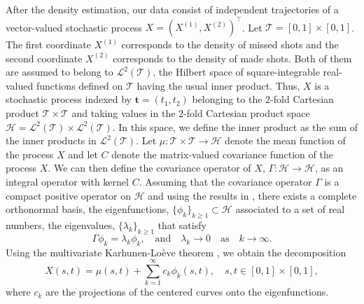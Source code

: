 \documentclass[USenglish]{article}
\theoremstyle{dgthm}
\theoremstyle{dgdef}
\begin{document}
After the density estimation, our data consist of independent trajectories of a vector-valued stochastic process $X = (X^{(1)}, X^{(2)})^{\top}$. Let $\mathcal{T} = [0, 1] \times [0, 1]$. The first coordinate $X^{(1)}$ corresponds to the density of missed shots and the second coordinate $X^{(2)}$ corresponds to the density of made shots. Both of them are assumed to belong to $\mathcal{L}^2(\mathcal{T})$, the Hilbert space of square-integrable real-valued functions defined on $\mathcal{T}$ having the usual inner product. Thus, $X$ is a stochastic process indexed by $\mathbf{t} = (t_1, t_2)$ belonging to the $2$-fold Cartesian product $\mathcal{T} \times \mathcal{T}$ and taking values in the $2$-fold Cartesian product space $\mathcal{H} = \mathcal{L}^2(\mathcal{T}) \times \mathcal{L}^2(\mathcal{T})$. In this space, we define the inner product as the sum of the inner products in $\mathcal{L}^2(\mathcal{T})$. Let $\mu: \mathcal{T} \times \mathcal{T} \rightarrow \mathcal{H}$ denote the mean function of the process $X$ and let $C$ denote the matrix-valued covariance function of the process $X$. We can then define the covariance operator of $X$, $\Gamma: \mathcal{H} \rightarrow \mathcal{H}$, as an integral operator with kernel $C$.
Assuming that the covariance operator $\Gamma$ is a compact positive operator on $\mathcal{H}$ and using the results in \cite{happMultivariateFunctionalPrincipal2018}, there exists a complete orthonormal basis, the eigenfunctions, $\{\phi_k\}_{k \geq 1} \subset \mathcal{H}$ associated to a set of real numbers, the eigenvalues, $\{\lambda_k\}_{k \geq 1}$ that satisfy
$$\Gamma \phi_k = \lambda_k \phi_k, \quad\text{and}\quad \lambda_k \rightarrow 0 \quad\text{as}\quad k \rightarrow \infty.$$
Using the multivariate Karhunen-Loève theorem \citep{happMultivariateFunctionalPrincipal2018}, we obtain the decomposition
\begin{equation}\label{eq:kl_decomp_inf}
	X(s, t) = \mu(s, t) + \sum_{k = 1}^{\infty} c_k\phi_k(s, t), \quad s, t \in [0, 1] \times [0, 1],
\end{equation}
where $c_k$ are the projections of the centered curves onto the eigenfunctions.
\end{document}
